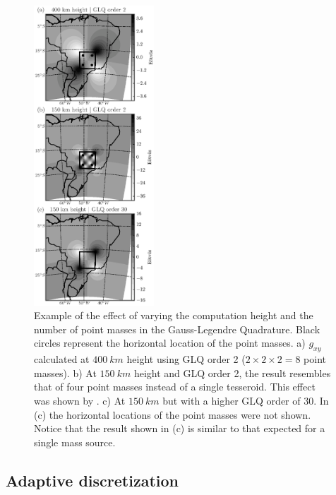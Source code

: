 \documentclass[paper,twocolumn,twoside]{geophysics}
\begin{document}
\begin{figure}
    \centering
    \includegraphics[width=0.4\textwidth]{figs/vary-height-and-order}
    \caption{
        Example of the effect of varying
        the computation height
        and the number of point masses in the Gauss-Legendre Quadrature.
        Black circles represent the horizontal location of the point masses.
        a) $g_{xy}$ calculated at $400\ km$ height using GLQ order 2
        ($2 \times 2 \times 2 = 8$ point masses).
        b) At $150\ km$ height and GLQ order 2,
        the result resembles that of
        four point masses instead of a single tesseroid.
        This effect was shown by \citet{Ku1977}.
        c) At $150\ km$ but with a higher GLQ order of 30. In (c) the horizontal locations of the point masses were not shown. Notice that the result shown in (c) is similar to that expected for a single mass source.
    }
    \label{fig:glqerrorsample}
\end{figure}


\subsection{Adaptive discretization}
\end{document}

